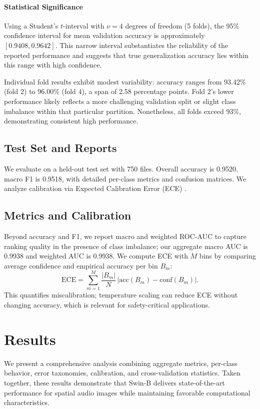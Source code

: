 \documentclass[11pt,a4paper]{article}
\begin{document}
\paragraph{Statistical Significance}
Using a Student's \(t\)-interval with \(\nu=4\) degrees of freedom (5 folds), the 95\% confidence interval for mean validation accuracy is approximately \([0.9408, 0.9642]\). This narrow interval substantiates the reliability of the reported performance and suggests that true generalization accuracy lies within this range with high confidence.

Individual fold results exhibit modest variability: accuracy ranges from 93.42\% (fold 2) to 96.00\% (fold 4), a span of 2.58 percentage points. Fold 2's lower performance likely reflects a more challenging validation split or slight class imbalance within that particular partition. Nonetheless, all folds exceed 93\%, demonstrating consistent high performance.

\subsection{Test Set and Reports}
We evaluate on a held-out test set with 750 files. Overall accuracy is 0.9520, macro F1 is 0.9518, with detailed per-class metrics and confusion matrices. We analyze calibration via Expected Calibration Error (ECE) \cite{guo2017calibration}.

\subsection{Metrics and Calibration}
Beyond accuracy and F1, we report macro and weighted ROC-AUC to capture ranking quality in the presence of class imbalance; our aggregate macro AUC is 0.9938 and weighted AUC is 0.9938. We compute ECE with \(M\) bins by comparing average confidence and empirical accuracy per bin \(B_m\):
\begin{equation}
 \mathrm{ECE} = \sum_{m=1}^M \frac{|B_m|}{N}\,\big|\mathrm{acc}(B_m) - \mathrm{conf}(B_m)\big|.
\end{equation}
This quantifies miscalibration; temperature scaling can reduce ECE without changing accuracy, which is relevant for safety-critical applications.

\section{Results}
We present a comprehensive analysis combining aggregate metrics, per-class behavior, error taxonomies, calibration, and cross-validation statistics. Taken together, these results demonstrate that Swin-B delivers state-of-the-art performance for spatial audio images while maintaining favorable computational characteristics.
\end{document}
